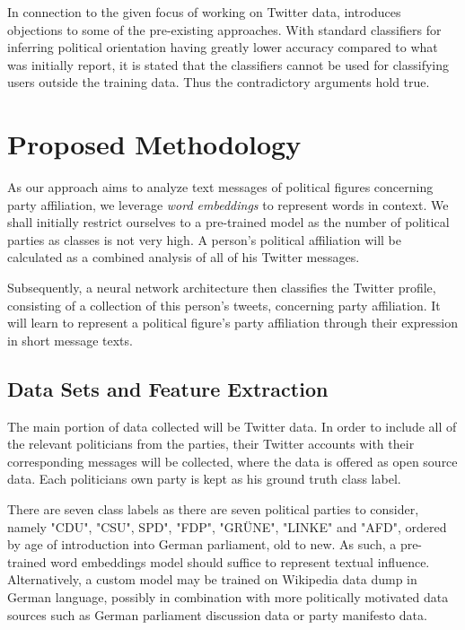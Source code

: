 \documentclass[10pt, oneside]{article}
\begin{document}
\begin{multicols}{2}
In connection to the given focus of working on Twitter data, \cite{Cohen2013} introduces objections to some of the pre-existing approaches. With standard classifiers for inferring political orientation having greatly lower accuracy compared to what was initially report, it is stated that the classifiers cannot be used for classifying users outside the training data. Thus the contradictory arguments hold true.


\section{Proposed Methodology}

As our approach aims to analyze text messages of political figures concerning party affiliation, we leverage \textit{word embeddings} to represent words in context. We shall initially restrict ourselves to a pre-trained model as the number of political parties as classes is not very high. A person's political affiliation will be calculated as a combined analysis of all of his Twitter messages.

Subsequently, a neural network architecture then classifies the Twitter profile, consisting of a collection of this person's tweets, concerning party affiliation. It will learn to represent a political figure's party affiliation through their expression in short message texts.

\subsection{Data Sets and Feature Extraction} 

The main portion of data collected will be Twitter data. In order to include all of the relevant politicians from the parties, their Twitter accounts with their corresponding messages will be collected, where the data is offered as open source data.
Each politicians own party is kept as his ground truth class label.

There are seven class labels as there are seven political parties to consider, namely "CDU", "CSU", SPD", "FDP", "GRÜNE", "LINKE" and "AFD", ordered by age of introduction into German parliament, old to new. As such, a pre-trained word embeddings model should suffice to represent textual influence.
Alternatively, a custom model may be trained on Wikipedia data dump in German language, possibly in combination with more politically motivated data sources such as German parliament discussion data or party manifesto data. 


\end{multicols}
\end{document}
